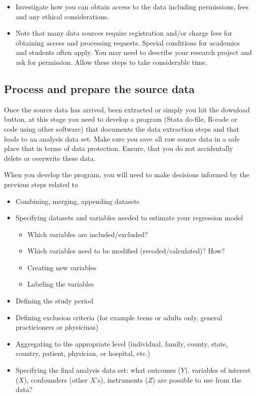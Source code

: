 \documentclass[
]{book}
\providecommand{\tightlist}{%
  \setlength{\itemsep}{0pt}\setlength{\parskip}{0pt}}
\begin{document}
\begin{itemize}
\tightlist
\item
  Investigate how you can obtain access to the data including
  permissions, fees and any ethical considerations.
\item
  Note that many data sources require registration and/or charge fees
  for obtaining access and processing requests. Special conditions for
  academics and students often apply. You may need to describe your
  research project and ask for permission. Allow these steps to take
  considerable time.
\end{itemize}

\hypertarget{process-and-prepare-the-source-data}{%
\subsection{Process and prepare the source
data}\label{process-and-prepare-the-source-data}}

Once the source data has arrived, been extracted or simply you hit the
download button, at this stage you need to develop a program (Stata
do-file, R-code or code using other software) that documents the data
extraction steps and that leads to an analysis data set. Make sure you
save all raw source data in a safe place that in terms of data
protection. Ensure, that you do not accidentally delete or overwrite
these data.

When you develop the program, you will need to make decisions informed
by the previous steps related to

\begin{itemize}
\tightlist
\item
  Combining, merging, appending datasets
\item
  Specifying datasets and variables needed to estimate your regression
  model

  \begin{itemize}
  \tightlist
  \item
    Which variables are included/excluded?
  \item
    Which variables need to be modified (recoded/calculated)? How?
  \item
    Creating new variables
  \item
    Labeling the variables
  \end{itemize}
\item
  Defining the study period
\item
  Defining exclusion criteria (for example teens or adults only, general
  practicioners or physicinas)
\item
  Aggregating to the appropriate level (individual, family, county,
  state, country, patient, physician, or hospital, etc.)
\item
  Specifying the final analysis data set: what outcomes (\(Y\)),
  variables of interest (\(X\)), confounders (other \(X\)'s),
  instruments (\(Z\)) are possible to use from the data?
\end{itemize}
\end{document}
